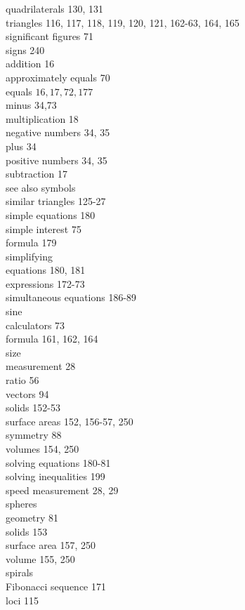 \documentclass[10pt]{article}
\begin{document}
quadrilaterals 130, 131\\
triangles 116, 117, 118, 119, 120, 121, 162-63, 164, 165\\
significant figures 71\\
signs 240\\
addition 16\\
approximately equals 70\\
equals $16,17,72,177$\\
minus 34,73\\
multiplication 18\\
negative numbers 34, 35\\
plus 34\\
positive numbers 34, 35\\
subtraction 17\\
see also symbols\\
similar triangles 125-27\\
simple equations 180\\
simple interest 75\\
formula 179\\
simplifying\\
equations 180, 181\\
expressions 172-73\\
simultaneous equations 186-89\\
sine\\
calculators 73\\
formula 161, 162, 164\\
size\\
measurement 28\\
ratio 56\\
vectors 94\\
solids 152-53\\
surface areas 152, 156-57, 250\\
symmetry 88\\
volumes 154, 250\\
solving equations 180-81\\
solving inequalities 199\\
speed measurement 28, 29\\
spheres\\
geometry 81\\
solids 153\\
surface area 157, 250\\
volume 155, 250\\
spirals\\
Fibonacci sequence 171\\
loci 115\\
\end{document}
